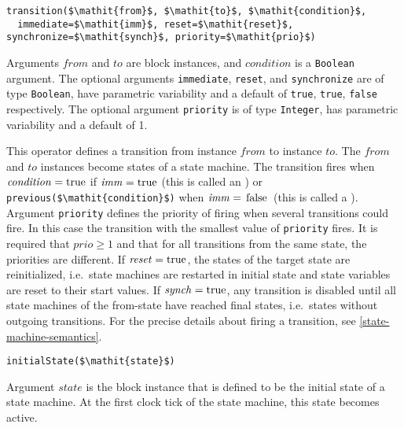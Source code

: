 \begin{operatordefinition}[transition]
\begin{synopsis}\begin{lstlisting}
transition($\mathit{from}$, $\mathit{to}$, $\mathit{condition}$,
  immediate=$\mathit{imm}$, reset=$\mathit{reset}$, synchronize=$\mathit{synch}$, priority=$\mathit{prio}$)
\end{lstlisting}\end{synopsis}
\begin{semantics}
Arguments $\mathit{from}$ and $\mathit{to}$ are block instances, and $\mathit{condition}$ is a \lstinline!Boolean! argument.  The optional arguments \lstinline!immediate!, \lstinline!reset!, and \lstinline!synchronize! are of type \lstinline!Boolean!, have parametric variability and a default of \lstinline!true!, \lstinline!true!, \lstinline!false! respectively.  The optional argument \lstinline!priority! is of type \lstinline!Integer!, has parametric variability and a default of 1.

This operator defines a transition from instance $\mathit{from}$ to instance $\mathit{to}$.  The $\mathit{from}$ and $\mathit{to}$ instances become states of a state machine.  The transition fires when $\mathit{condition} = \text{\lstinline!true!}$ if $\mathit{imm} = \text{\lstinline!true!}$ (this is called an ) or \lstinline!previous($\mathit{condition}$)! when $\mathit{imm} = \text{\lstinline!false!}$ (this is called a ).  Argument \lstinline!priority! defines the priority of firing when several transitions could fire.  In this case the transition with the smallest value of \lstinline!priority! fires.  It is required that $\mathit{prio} \geq 1$ and that for all transitions from the same state, the priorities are different. If $\mathit{reset} = \text{\lstinline!true!}$, the states of the target state are reinitialized, i.e.\ state machines are restarted in initial state and state variables are reset to their start values.  If $\mathit{synch} = \text{\lstinline!true!}$, any transition is disabled until all state machines of the from-state have reached final states, i.e.\ states without outgoing transitions.  For the precise details about firing a transition, see \cref{state-machine-semantics}.
\end{semantics}
\end{operatordefinition}

\begin{operatordefinition}[initialState]
\begin{synopsis}\begin{lstlisting}
initialState($\mathit{state}$)
\end{lstlisting}\end{synopsis}
\begin{semantics}
Argument $\mathit{state}$ is the block instance that is defined to be the initial state of a state machine.  At the first clock tick of the state machine, this state becomes active.
\end{semantics}
\end{operatordefinition}

